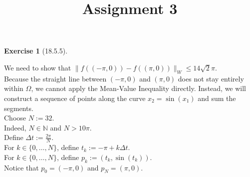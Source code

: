 \documentclass[11pt,a4paper]{article}
\theoremstyle{definition}
\newtheorem{exercise}{Exercise}
\theoremstyle{plain}
\theoremstyle{remark}
\begin{document}
\title{Assignment 3}
\date{}
\maketitle

\begin{exercise}[18.5.5]
\end{exercise}

\noindent We need to show that $\|f((-\pi, 0)) - f((\pi, 0))\|_W \le 14\sqrt{2}\pi$.\\
Because the straight line between $(-\pi, 0)$ and $(\pi, 0)$ does not stay entirely within $\Omega$, we cannot apply the Mean-Value Inequality directly. Instead, we will construct a sequence of points along the curve $x_2 = \sin(x_1)$ and sum the segments.\\

\noindent Choose $N := 32$. \\
Indeed, $N \in \mathbb{N}$ and $N > 10\pi$. \\
Define $\Delta t := \frac{2\pi}{N}$. \\
For $k \in \{0, \dots, N\}$, define $t_k := -\pi + k \Delta t$. \\
For $k \in \{0, \dots, N\}$, define $p_k := (t_k, \sin(t_k))$. \\
Notice that $p_0 = (-\pi, 0)$ and $p_N = (\pi, 0)$. \\
\end{document}
